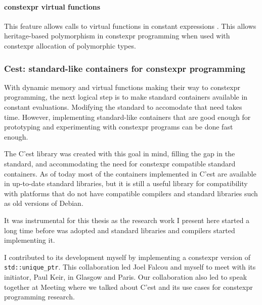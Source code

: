 \documentclass[../main]{subfiles}
\begin{document}
\paragraph{
  \gls{constexpr} virtual functions
}

This feature allows calls to virtual functions in constant expressions
\cite{virtual-constexpr}. This allows heritage-based polymorphism in \gls{constexpr}
programming when used with \gls{constexpr} allocation of polymorphic types.

\subsubsection{
  Cest: standard-like containers for \gls{constexpr} programming
}

With dynamic memory and virtual functions making their way to
\gls{constexpr} programming, the next logical step is to make standard \cpp
containers available in constant evaluations.
Modifying the \cpp standard to accomodate that need takes time.
However, implementing standard-like containers that are good enough
for prototyping and experimenting with \gls{constexpr} programs
can be done fast enough.

The C'est \cite{cest} library was created with this goal in mind, filling the
gap in the \cpp standard, and accommodating the need for \gls{constexpr} compatible
standard containers.
As of today most of the containers implemented in C'est are available in
up-to-date standard libraries, but it is still a useful library for
compatibility with platforms that do not have  compatible compilers and
standard libraries such as old versions of Debian.

It was instrumental for this thesis as the research work I present here started
a long time before  was adopted and standard libraries and compilers
started implementing it.

I contributed to its development myself by implementing a \gls{constexpr} version
of \lstinline{std::unique_ptr}. This collaboration led Joel Falcou and myself to
meet with its initiator, Paul Keir, in Glasgow and Paris.
Our collaboration also led to speak together at
Meeting  \cite{meetingcpp22} where we talked about C'est and
its use cases for \gls{constexpr} programming research.

\end{document}
